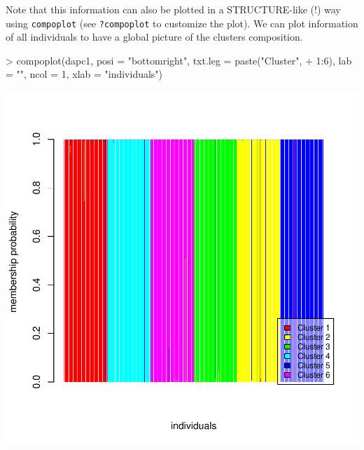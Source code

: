 \documentclass{article}
\newcommand{\code}[1]{{{\tt #1}}}
\begin{document}
Note that this information can also be plotted in a STRUCTURE-like (!) way using \texttt{compoplot}
(see \code{?compoplot} to customize the plot).
We can plot information of all individuals to have a global picture of the clusters composition.
\begin{Schunk}
\begin{Sinput}
> compoplot(dapc1, posi = "bottomright", txt.leg = paste("Cluster", 
+     1:6), lab = "", ncol = 1, xlab = "individuals")
\end{Sinput}
\end{Schunk}
\includegraphics{figs/dapc-023}
\end{document}
